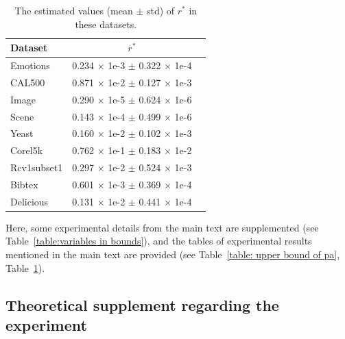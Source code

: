 \documentclass{article}
\begin{document}
\begin{table}
\caption{The estimated values (mean $\pm$ std) of 
$r^*$ in these datasets.}
\label{table: estimate_var}
\centering
\begin{threeparttable} 
\begin{tabular}{lcc}
    \toprule
    Dataset  & $r^*$   \\
    \midrule
    Emotions   & 0.234 $\times$ 1e-3 $\pm$ 0.322 $\times$ 1e-4  \\
    CAL500    & 0.871 $\times$ 1e-2 $\pm$ 0.127 $\times$ 1e-3 \\
    Image    & 0.290 $\times$ 1e-5 $\pm$ 0.624 $\times$ 1e-6 \\
    Scene    &  0.143 $\times$ 1e-4 $\pm$ 0.499 $\times$ 1e-6  \\
    Yeast    & 0.160 $\times$ 1e-2 $\pm$ 0.102 $\times$ 1e-3 \\
    Corel5k       &  0.762 $\times$ 1e-1 $\pm$ 0.183 $\times$ 1e-2 \\
    Rcv1subset1     & 0.297 $\times$ 1e-2 $\pm$ 0.524 $\times$ 1e-3 \\
    Bibtex   &  0.601 $\times$ 1e-3 $\pm$ 0.369 $\times$ 1e-4 \\
    Delicious   & 0.131 $\times$ 1e-2 $\pm$ 0.441 $\times$ 1e-4 \\
\bottomrule
\end{tabular}
\end{threeparttable}
\end{table}

Here, some experimental details from the main text are supplemented (see Table~\ref{table:variables in bounds}), and the tables of experimental results mentioned in the main text are provided (see Table~\ref{table: upper bound of pa}, Table~\ref{table: estimate_var}).

\subsection{Theoretical supplement regarding the experiment}
\end{document}

